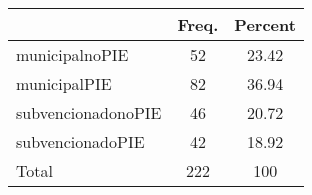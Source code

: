 {
\def\sym#1{\ifmmode^{#1}\else\(^{#1}\)\fi}
\begin{tabular}{l*{1}{cc}}
\hline\hline
            &       Freq.&     Percent\\
\hline
municipalnoPIE&          52&       23.42\\
municipalPIE&          82&       36.94\\
subvencionadonoPIE&          46&       20.72\\
subvencionadoPIE&          42&       18.92\\
Total       &         222&         100\\
\hline\hline
\end{tabular}
}

